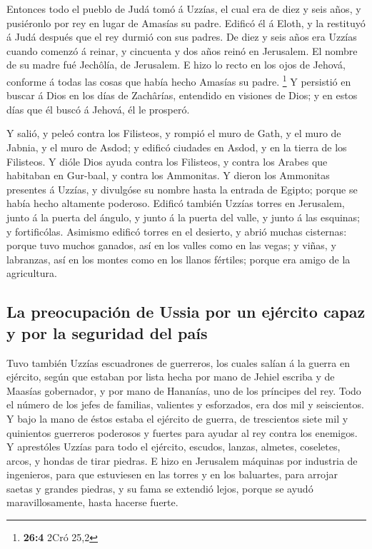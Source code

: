  Entonces todo el pueblo de Judá tomó á Uzzías, el cual era
de diez y seis años, y pusiéronlo por rey en lugar de Amasías su padre.
 Edificó él á Eloth, y la restituyó á Judá después que el
rey durmió con sus padres.  De diez y seis años era Uzzías
cuando comenzó á reinar, y cincuenta y dos años reinó en Jerusalem. El
nombre de su madre fué Jechôlía, de Jerusalem.  E hizo lo
recto en los ojos de Jehová, conforme á todas las cosas que había hecho
Amasías su padre. \footnote{\textbf{26:4} 2Cró 25,2}  Y
persistió en buscar á Dios en los días de Zachârías, entendido en
visiones de Dios; y en estos días que él buscó á Jehová, él le prosperó.

 Y salió, y peleó contra los Filisteos, y rompió el muro de
Gath, y el muro de Jabnia, y el muro de Asdod; y edificó ciudades en
Asdod, y en la tierra de los Filisteos.  Y dióle Dios ayuda
contra los Filisteos, y contra los Arabes que habitaban en Gur-baal, y
contra los Ammonitas.  Y dieron los Ammonitas presentes á
Uzzías, y divulgóse su nombre hasta la entrada de Egipto; porque se
había hecho altamente poderoso.  Edificó también Uzzías
torres en Jerusalem, junto á la puerta del ángulo, y junto á la puerta
del valle, y junto á las esquinas; y fortificólas. 
Asimismo edificó torres en el desierto, y abrió muchas cisternas: porque
tuvo muchos ganados, así en los valles como en las vegas; y viñas, y
labranzas, así en los montes como en los llanos fértiles; porque era
amigo de la agricultura.

\hypertarget{la-preocupaciuxf3n-de-ussia-por-un-ejuxe9rcito-capaz-y-por-la-seguridad-del-pauxeds}{%
\subsection{La preocupación de Ussia por un ejército capaz y por la
seguridad del
país}\label{la-preocupaciuxf3n-de-ussia-por-un-ejuxe9rcito-capaz-y-por-la-seguridad-del-pauxeds}}

 Tuvo también Uzzías escuadrones de guerreros, los cuales
salían á la guerra en ejército, según que estaban por lista hecha por
mano de Jehiel escriba y de Maasías gobernador, y por mano de Hananías,
uno de los príncipes del rey.  Todo el número de los jefes
de familias, valientes y esforzados, era dos mil y seiscientos.
 Y bajo la mano de éstos estaba el ejército de guerra, de
trescientos siete mil y quinientos guerreros poderosos y fuertes para
ayudar al rey contra los enemigos.  Y aprestóles Uzzías
para todo el ejército, escudos, lanzas, almetes, coseletes, arcos, y
hondas de tirar piedras.  E hizo en Jerusalem máquinas por
industria de ingenieros, para que estuviesen en las torres y en los
baluartes, para arrojar saetas y grandes piedras, y su fama se extendió
lejos, porque se ayudó maravillosamente, hasta hacerse fuerte.

